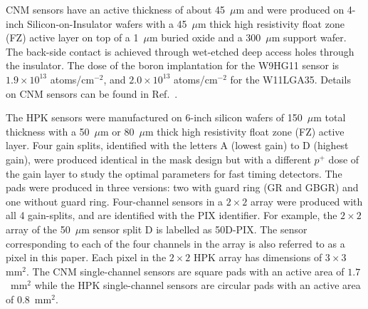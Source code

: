 \documentclass[preprint,1p]{elsarticle}
\begin{document}

CNM sensors have an active thickness of about 45~$\mu$m and were
produced on 4-inch Silicon-on-Insulator wafers with a 45~$\mu$m thick high
resistivity float zone (FZ) active layer on top of a 1~$\mu$m buried oxide and a
300~$\mu$m support wafer. The back-side contact is achieved through wet-etched
deep access holes through the insulator. The dose of the boron implantation for
the  W9HG11 sensor is $1.9\times10^{13}$ atoms/cm$^{-2}$,
and $2.0\times10^{13}$ atoms/cm$^{-2}$ for the W11LGA35. Details on CNM sensors
can be found in Ref.~\cite{CNMSensors, Cartiglia201783}. 

The HPK sensors were manufactured on 6-inch silicon wafers of 150~$\mu$m total
thickness with a 50~$\mu$m or 80~$\mu$m thick high resistivity float zone (FZ)
active layer. Four gain splits, identified with the letters A (lowest gain) to D
(highest gain), were produced identical in the mask design but with a different
$p^+$ dose of the gain layer to study the optimal parameters for fast timing
detectors. The pads were produced in three versions: two with guard ring (GR and
GBGR) and one without guard ring. Four-channel sensors in a $2\times 2$ array
were produced with all 4 gain-splits, and are identified with the PIX
identifier. For example, the $2\times 2$ array of the 50~$\mu$m sensor split D
is labelled as 50D-PIX. The sensor corresponding to each of the four channels in
the array is also referred to as a pixel in this paper. Each pixel in the
$2\times 2$ HPK array has dimensions of $3\times 3$~$\mathrm{mm}^{2}$. The CNM
single-channel sensors are square pads with an active area of
$1.7$~$\mathrm{mm}^{2}$ while the HPK single-channel sensors are circular pads
with an active area of $0.8$~$\mathrm{mm}^{2}$.
\end{document}
